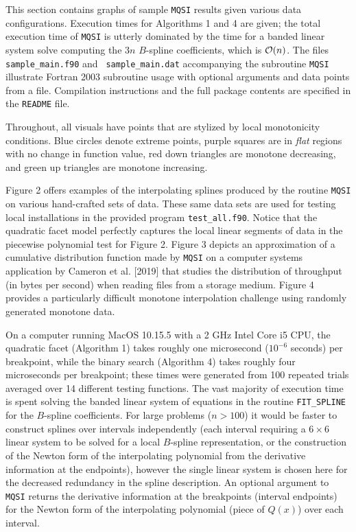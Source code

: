 This section contains graphs of sample {\tt MQSI} results given various
data configurations. Execution times for Algorithms 1 and 4 are given; the
total execution time of {\tt MQSI} is utterly dominated by the time for a
banded linear system solve computing the $3n$ $B$-spline coefficients,
which is ${\cal O}(n)$.  The files {\tt sample\_main.f90} and {\tt
sample\_main.dat} accompanying the subroutine {\tt MQSI} illustrate Fortran
2003 subroutine usage with optional arguments and data points from a file.
Compilation instructions and the full package contents are specified in
the {\tt README} file.

Throughout, all visuals have points that are stylized by local
monotonicity conditions. Blue circles denote extreme points, purple
squares are in {\it flat} regions with no change in function value,
red down triangles are monotone decreasing, and green up triangles are
monotone increasing.

Figure 2 offers examples of the interpolating splines produced by the
routine {\tt MQSI} on various hand-crafted sets of data. These same
data sets are used for testing local installations in the provided
program {\tt test\_all.f90}. Notice that the quadratic facet model
perfectly captures the local linear segments of data in the piecewise
polynomial test for Figure 2. Figure 3 depicts an approximation of a
cumulative distribution function made by {\tt MQSI} on a computer
systems application by Cameron et al. [2019] that studies the
distribution of throughput (in bytes per second) when reading files
from a storage medium. Figure 4 provides a particularly difficult
monotone interpolation challenge using randomly generated monotone
data.

On a computer running MacOS 10.15.5 with a 2 GHz Intel Core i5 CPU, the
quadratic facet (Algorithm 1) takes roughly one microsecond ($10^{-6}$
seconds) per breakpoint, while the binary search (Algorithm 4) takes roughly
four microseconds per breakpoint; these times were generated from 100
repeated trials averaged over 14 different testing functions.  The vast
majority of execution time is spent solving the banded linear system of
equations in the routine {\tt FIT\_SPLINE} for the $B$-spline coefficients.
For large problems ($n > 100$) it would be faster to construct splines
over intervals independently (each interval requiring a $6 \times 6$ linear
system to be solved for a local $B$-spline representation, or the
construction of the Newton form of the interpolating polynomial from the
derivative information at the endpoints), however the single linear system
is chosen here for the decreased redundancy in the spline description. An
optional argument to {\tt MQSI} returns the derivative information at the
breakpoints (interval endpoints) for the Newton form of the interpolating
polynomial (piece of $Q(x)$) over each interval.

